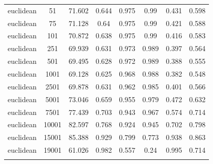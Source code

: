 \documentclass[journal,twocolumn]{IEEEtran}
\begin{document}
\begin{appendices}
\begin{table}[H]
\begin{tabular}{cccccccc}
 euclidean &    51 &  71.602 & 0.644 & 0.975 &  0.99 & 0.431 & 0.598\\
 euclidean &    75 &  71.128 &  0.64 & 0.975 &  0.99 & 0.421 & 0.588\\
 euclidean &   101 &  70.872 & 0.638 & 0.975 &  0.99 & 0.416 & 0.583\\
 euclidean &   251 &  69.939 & 0.631 & 0.973 & 0.989 & 0.397 & 0.564\\
 euclidean &   501 &  69.495 & 0.628 & 0.972 & 0.989 & 0.388 & 0.555\\
 euclidean &  1001 &  69.128 & 0.625 & 0.968 & 0.988 & 0.382 & 0.548\\
 euclidean &  2501 &  69.878 & 0.631 & 0.962 & 0.985 & 0.401 & 0.566\\
 euclidean &  5001 &  73.046 & 0.659 & 0.955 & 0.979 & 0.472 & 0.632\\
 euclidean &  7501 &  77.439 & 0.703 & 0.943 & 0.967 & 0.574 & 0.714\\
 euclidean & 10001 &  82.597 & 0.768 & 0.924 & 0.945 & 0.702 & 0.798\\
 euclidean & 15001 &  85.388 & 0.929 & 0.799 & 0.773 & 0.938 & 0.863\\
 euclidean & 19001 &  61.026 & 0.982 & 0.557 &  0.24 & 0.995 & 0.714\\ \hline\\ [-1.5ex]
    \end{tabular}
\end{table}


\end{appendices}
\end{document}
